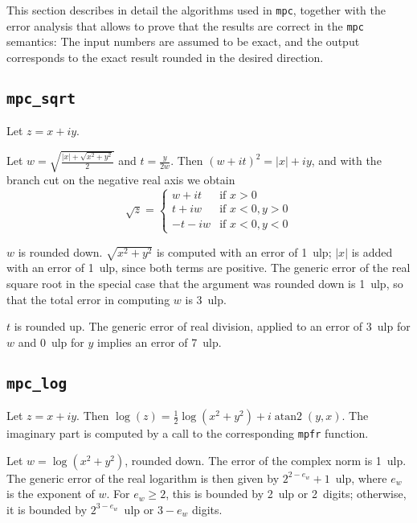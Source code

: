 \documentclass {article}
\newcommand {\mpc}{\texttt {mpc}}
\newcommand {\mpfr}{\texttt {mpfr}}
\newcommand {\ulp}[1]{#1~ulp}
\newcommand {\atantwo}{\operatorname {atan2}}
\begin{document}
This section describes in detail the algorithms used in \mpc, together with the error analysis that allows to prove that the results are correct in the {\mpc} semantics: The input numbers are assumed to be exact, and the output corresponds to the exact result rounded in the desired direction.


\subsection {\texttt {mpc\_sqrt}}

Let $z = x + i y$.

Let $w = \sqrt { \frac {|x| + \sqrt {x^2 + y^2}}{2}}$ and
$t = \frac {y}{2w}$. Then $(w + it)^2 = |x| + iy$, and with the branch cut on the negative real axis we obtain
\[
\sqrt z = \left\{
\begin {array}{cl}
w + i t & \text {if } x > 0 \\
t + i w & \text {if } x < 0, y > 0 \\
-t - i w & \text {if } x < 0, y < 0
\end {array}
\right.
\]

$w$ is rounded down. $\sqrt {x^2 + y^2}$ is computed with an error of \ulp{1}; $|x|$ is added with an error of \ulp{1}, since both terms are positive. The generic error of the real square root in the special case that the argument was rounded down is \ulp{1}, so that the total error in computing $w$ is \ulp{3}.

$t$ is rounded up. The generic error of real division, applied to an error of \ulp{3} for $w$ and \ulp{0} for $y$ implies an error of \ulp{7}.


\subsection {\texttt {mpc\_log}}

Let $z = x + i y$. Then $\log (z) = \frac {1}{2} \log (x^2 + y^2) + i \atantwo (y, x)$. The imaginary part is computed by a call to the corresponding {\mpfr} function.

Let $w = \log (x^2 + y^2)$, rounded down. The error of the complex norm is \ulp{1}. The generic error of the real logarithm is then given by \ulp{$2^{2 - e_w} + 1$}, where $e_w$ is the exponent of $w$. For $e_w \geq 2$, this is bounded by \ulp{2} or 2~digits; otherwise, it is bounded by \ulp{$2^{3 - e_w}$} or $3 - e_w$ digits.
\end{document}
